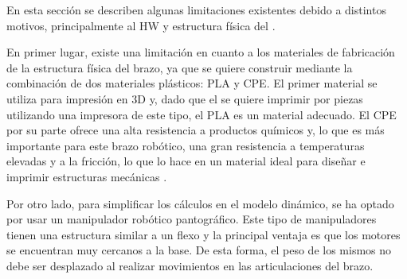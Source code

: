 En esta sección se describen algunas limitaciones existentes debido a distintos motivos, principalmente al \ac{HW} y estructura física del \pArm{}.

En primer lugar, existe una limitación en cuanto a los materiales de fabricación de la estructura física del brazo, ya que se quiere construir mediante la combinación de dos materiales plásticos: \ac{PLA} y \ac{CPE}. El primer material se utiliza para impresión en 3D y, dado que el \pArm{} se quiere imprimir por piezas utilizando una impresora de este tipo, el \ac{PLA} es un material adecuado.
El \ac{CPE} por su parte ofrece una alta resistencia a productos químicos y, lo que es
más importante para este brazo robótico, una gran resistencia a temperaturas elevadas
y a la fricción, lo que lo hace en un material ideal para diseñar e imprimir estructuras
mecánicas \cite{CPEFamilyUltimaker}.

Por otro lado, para simplificar los cálculos en el modelo dinámico, se ha optado por usar un manipulador robótico pantográfico. Este tipo de manipuladores tienen una estructura similar a un flexo y la principal ventaja es que los motores se encuentran muy cercanos a la base. De esta forma, el peso de los mismos no debe ser desplazado al realizar movimientos en las articulaciones del brazo.
